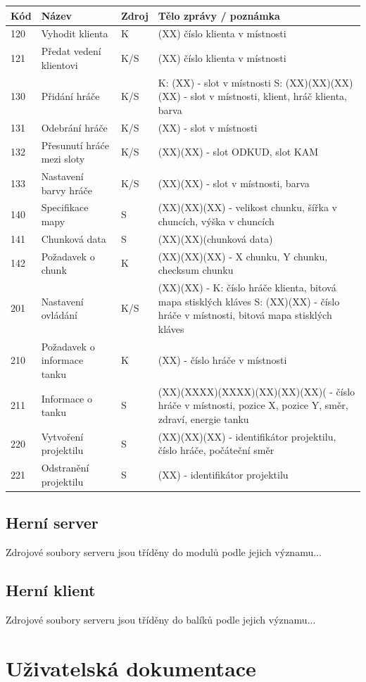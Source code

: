 \documentclass[12pt,a4paper]{article}
\let\oldsection\section
\renewcommand\section{\clearpage\oldsection}
\begin{document}
\begin{table}[h]
\center
\begin{tabular}{|l|p{3cm}|l|p{10cm}|}
\hline
\textbf{Kód} & \textbf{Název} & \textbf{Zdroj} & \textbf{Tělo zprávy / poznámka}\\ \hline
120 & Vyhodit klienta & K & (XX) číslo klienta v místnosti \\ \hline
121 & Předat vedení klientovi & K/S & (XX) číslo klienta v místnosti \\ \hline
130 & Přidání hráče & K/S & K: (XX) - slot v místnosti \newline S: (XX)(XX)(XX)(XX) - slot v místnosti, klient, hráč klienta, barva \\ \hline
131 & Odebrání hráče & K/S & (XX) - slot v místnosti \\ \hline
132 & Přesunutí hráće mezi sloty & K/S& (XX)(XX) - slot ODKUD, slot KAM \\ \hline
133 & Nastavení barvy hráče & K/S & (XX)(XX) - slot v místnosti, barva \\ \hline
140 & Specifikace mapy & S & (XX)(XX)(XX) - velikost chunku, šířka v chuncích, výška v chuncích \\ \hline
141 & Chunková data & S & (XX)(XX)(chunková data)\\ \hline
142 & Požadavek o chunk & K & (XX)(XX)(XX) - X chunku, Y chunku, checksum chunku \\ \hline
201 & Nastavení ovládání & K/S & (XX)(XX) - K: číslo hráče klienta, bitová mapa stisklých kláves \newline S: (XX)(XX) - číslo hráče v místnosti, bitová mapa stisklých kláves \\ \hline
210 & Požadavek o informace tanku & K & (XX) - číslo hráče v místnosti \\ \hline
211 & Informace o tanku & S & (XX)(XXXX)(XXXX)(XX)(XX)(XX)( - číslo hráče v místnosti, pozice X, pozice Y, směr, zdraví, energie tanku \\ \hline
220 & Vytvoření projektilu & S & (XX)(XX)(XX) - identifikátor projektilu, číslo hráče, počáteční směr \\ \hline
221 & Odstranění projektilu & S & (XX) - identifikátor projektilu \\ \hline


\end{tabular}
\end{table}

\newpage
\subsection{Herní server}
Zdrojové soubory serveru jsou tříděny do modulů podle jejich významu...
\subsection{Herní klient}
Zdrojové soubory serveru jsou tříděny do balíků podle jejich významu...
\section{Uživatelská dokumentace}




\end{document}
